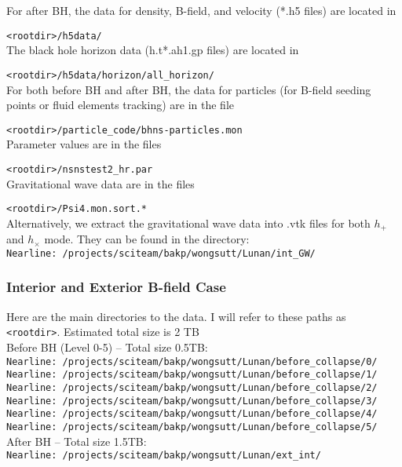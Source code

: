 \documentclass{article}
\begin{document}
For after BH, the data for density, B-field, and velocity (*.h5 files) are located in 
	
	\verb|<rootdir>/h5data/| \\
The black hole horizon data (h.t*.ah1.gp files) are located in
	
	\verb|<rootdir>/h5data/horizon/all_horizon/| \\
	
For both before BH and after BH, the data for particles (for B-field seeding points or fluid elements tracking) are in the file 
	
	\verb|<rootdir>/particle_code/bhns-particles.mon| \\
Parameter values are in the files

	\verb|<rootdir>/nsnstest2_hr.par| \\ 
Gravitational wave data are in the files

	\verb|<rootdir>/Psi4.mon.sort.*| \\ 
Alternatively, we extract the gravitational wave data into .vtk files for both $h_+$ and $h_\times$ mode. They can be found in the directory: \\
	\verb|Nearline: /projects/sciteam/bakp/wongsutt/Lunan/int_GW/| \\


\subsubsection{Interior and Exterior B-field Case}
Here are the main directories to the data. I will refer to these paths as \verb|<rootdir>|. Estimated total size is 2 TB \\

Before BH (Level 0-5) -- Total size 0.5TB: \\
	\verb|Nearline: /projects/sciteam/bakp/wongsutt/Lunan/before_collapse/0/| \\
	\verb|Nearline: /projects/sciteam/bakp/wongsutt/Lunan/before_collapse/1/| \\
	\verb|Nearline: /projects/sciteam/bakp/wongsutt/Lunan/before_collapse/2/| \\
	\verb|Nearline: /projects/sciteam/bakp/wongsutt/Lunan/before_collapse/3/| \\
	\verb|Nearline: /projects/sciteam/bakp/wongsutt/Lunan/before_collapse/4/| \\
	\verb|Nearline: /projects/sciteam/bakp/wongsutt/Lunan/before_collapse/5/| \\
	
After BH -- Total size 1.5TB: \\
	\verb|Nearline: /projects/sciteam/bakp/wongsutt/Lunan/ext_int/| \\
\end{document}
